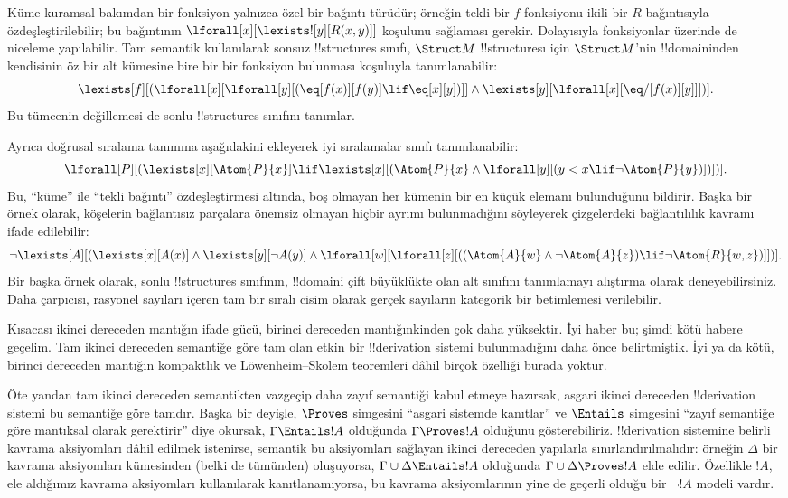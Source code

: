 Küme kuramsal bakımdan bir fonksiyon yalnızca özel bir bağıntı türüdür;
örneğin tekli bir $f$ fonksiyonu ikili bir $R$ bağıntısıyla
özdeşleştirilebilir; bu bağıntının $\lforall[x][\lexists![y][R(x,y)]]$
koşulunu sağlaması gerekir. Dolayısıyla fonksiyonlar
üzerinde de niceleme yapılabilir. Tam semantik kullanılarak sonsuz
!!{structure}s sınıfı, $\Struct M$ !!{structure}{}sı için $\Struct M$'nin
!!{domain}{}inden kendisinin öz bir alt kümesine bire bir bir fonksiyon bulunması
koşuluyla tanımlanabilir:
\[
\lexists[f][(\lforall[x][\lforall[y][(\eq[f(x)][f(y)] \lif \eq[x][y])]]
  \land \lexists[y][\lforall[x][\eq/[f(x)][y]]])].
\]
Bu tümcenin değillemesi de sonlu !!{structure}s sınıfını tanımlar.

Ayrıca doğrusal sıralama tanımına aşağıdakini ekleyerek iyi sıralamalar sınıfı
tanımlanabilir:
\[
\lforall[P][(\lexists[x][\Atom{P}{x}] \lif \lexists[x][(\Atom{P}{x}
    \land \lforall[y][(y < x \lif \lnot \Atom{P}{y})])])].
\]
Bu, ``küme'' ile ``tekli bağıntı'' özdeşleştirmesi altında, boş olmayan
her kümenin bir en küçük elemanı bulunduğunu bildirir. Başka bir örnek olarak,
köşelerin bağlantısız parçalara önemsiz olmayan hiçbir ayrımı bulunmadığını
söyleyerek çizgelerdeki bağlantılılık kavramı ifade edilebilir:
\[
\lnot \lexists[A][(\lexists[x][A(x)] \land \lexists[y][\lnot A(y)]
  \land \lforall[w][\lforall[z][((\Atom{A}{w} \land \lnot \Atom{A}{z})
      \lif \lnot \Atom{R}{w,z})]])].
\]
Bir başka örnek olarak, sonlu !!{structure}s sınıfının, !!{domain}{}i çift
büyüklükte olan alt sınıfını tanımlamayı alıştırma olarak deneyebilirsiniz.
Daha çarpıcısı,
rasyonel sayıları içeren tam bir sıralı cisim olarak gerçek sayıların kategorik
bir betimlemesi verilebilir.

Kısacası ikinci dereceden mantığın ifade gücü, birinci dereceden mantığınkinden
çok daha yüksektir. İyi haber bu; şimdi kötü habere geçelim. Tam ikinci dereceden semantiğe
göre tam olan etkin bir !!{derivation} sistemi bulunmadığını daha önce
belirtmiştik. İyi ya da kötü, birinci dereceden mantığın kompaktlık ve
L\"owenheim--Skolem teoremleri dâhil birçok özelliği burada yoktur.

Öte yandan tam ikinci dereceden semantikten vazgeçip daha zayıf semantiği
kabul etmeye hazırsak, asgari ikinci dereceden !!{derivation} sistemi bu semantiğe göre
tamdır. Başka bir deyişle, $\Proves$ simgesini ``asgari sistemde kanıtlar'' ve
$\Entails$ simgesini ``zayıf semantiğe göre mantıksal olarak gerektirir'' diye
okursak, $\Gamma \Entails !A$ olduğunda $\Gamma \Proves !A$ olduğunu
gösterebiliriz. !!{derivation} sistemine belirli kavrama aksiyomları dâhil
edilmek istenirse, semantik bu aksiyomları sağlayan ikinci dereceden yapılarla
sınırlandırılmalıdır: örneğin $\Delta$ bir kavrama aksiyomları kümesinden
(belki de tümünden) oluşuyorsa, $\Gamma \cup \Delta \Entails !A$ olduğunda
$\Gamma \cup \Delta \Proves !A$ elde edilir. Özellikle $!A$, ele aldığımız
kavrama aksiyomları kullanılarak kanıtlanamıyorsa, bu kavrama aksiyomlarının
yine de geçerli olduğu bir $\lnot !A$ modeli vardır.

